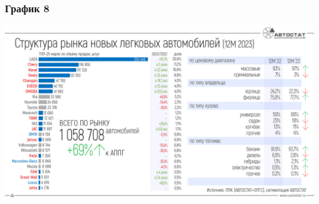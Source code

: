 \begin{frame}
    \frametitle{График 8}
    \begin{center}
        \centering
        \includegraphics[width=1\linewidth]{Media/Images/plot-8.png}
    \end{center}
\end{frame}